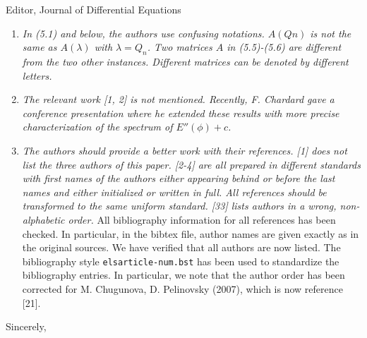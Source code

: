 \documentclass[11pt]{letter}
\begin{document}
\begin{letter}{Editor, Journal of Differential Equations}
\begin{enumerate}
    \item \emph{In (5.1) and below, the authors use confusing notations. $A(Qn)$ is not the same as $A(\lambda)$ with $\lambda = Q_n$. Two matrices $A$ in (5.5)-(5.6) are different from the two other instances. Different matrices can be denoted by different letters.}
    \vspace{4mm}

    \item \emph{The relevant work [1, 2] is not mentioned. Recently, F. Chardard gave a conference presentation where he extended these results with more precise characterization of the spectrum of $E''(\phi) + c$.}
    \vspace{4mm}

    \item \emph{The authors should provide a better work with their references. [1] does not list the three authors of this paper. [2-4] are all prepared in different standards with first names of the authors either appearing behind or before the last names and either initialized or written in full. All references should be transformed to the same uniform standard. [33] lists authors in a wrong, non-alphabetic order.} All bibliography information for all references has been checked. In particular, in the bibtex file, author names are given exactly as in the original sources. We have verified that all authors are now listed. The bibliography style \texttt{elsarticle-num.bst} has been used to standardize the bibliography entries. In particular, we note that the author order has been corrected for M. Chugunova, D. Pelinovsky (2007), which is now reference [21].
\end{enumerate}



\closing{Sincerely,}

\end{letter}
\end{document}
